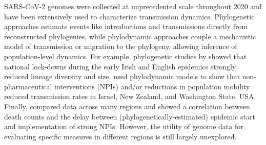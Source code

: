 \documentclass[9pt,twoside,lineno]{pnas-new} %
\begin{document}
SARS-CoV-2 genomes were collected at unprecedented scale throughout 2020 \cite{Alm2020} and have been extensively used to characterize transmission dynamics. Phylogenetic approaches estimate events like introductions and transmissions directly from reconstructed phylogenies, while phylodynamic approaches couple a mechanistic model of transmission or migration to the phylogeny, allowing inference of population-level dynamics. For example, phylogenetic studies by \cite{Mallon2020, duPlessis2021} showed that national lock-downs during the early Irish and English epidemics  strongly reduced lineage diversity and size. \cite{Miller2020, Geoghegan2020a, Muller2020a} used phylodynamic models to show that non-pharmaceutical interventions (NPIs) and/or reductions in population mobility reduced transmission rates in Israel, New Zealand, and Washington State, USA. Finally, \cite{Ragonnet-Cronin2021} compared data across many regions and showed a correlation between death counts and the delay between (phylogenetically-estimated) epidemic start and implementation of strong NPIs. However, the utility of genome data for evaluating specific measures in different regions is still largely unexplored.

\end{document}
